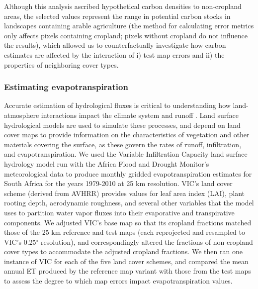 \documentclass[12 pt, titlepage, a4paper]{article}
\begin{document}
Although this analysis ascribed hypothetical carbon densities to non-cropland areas, the selected values represent the range in potential carbon stocks in landscapes containing arable agriculture (the method for calculating error metrics only affects pixels containing cropland; pixels without cropland do not influence the results), which allowed us to counterfactually investigate how carbon estimates are affected by the interaction of i) test map errors and ii) the properties of neighboring cover types. 

\vspace{-0.3 cm}
\subsubsection*{Estimating evapotranspiration}
\vspace{-0.2 cm}
Accurate estimation of hydrological fluxes is critical to understanding how land-atmosphere interactions impact the climate system and runoff \citep{liang_simple_1994}. Land surface hydrological models are used to simulate these processes, and depend on land cover maps to provide information on the characteristics of vegetation and other materials covering the surface, as these govern the rates of runoff, infiltration, and evapotranspiration. We used the Variable Infiltration Capacity \citep[VIC;][]{liang_simple_1994} land surface hydrology model run with the Africa Flood and Drought Monitor's meteorological data \citep{sheffield_drought_2013} to produce monthly gridded evapotranspiration estimates for South Africa for the years 1979-2010 at 25 km resolution. VIC's land cover scheme (derived from AVHRR) provides values for leaf area index (LAI), plant rooting depth, aerodynamic roughness, and several other variables that the model uses to partition water vapor fluxes into their evaporative and transpirative components. We adjusted VIC's base map so that its cropland fractions matched those of the 25 km reference and test maps (each reprojected and resampled to VIC's 0.25$^{\circ}$ resolution), and correspondingly altered the fractions of non-cropland cover types to accommodate the adjusted cropland fractions. We then ran one instance of VIC for each of the five land cover schemes, and compared the mean annual ET produced by the reference map variant with those from the test maps to assess the degree to which map errors impact evapotranspiration values. 

\vspace{-0.3 cm}
\end{document}
